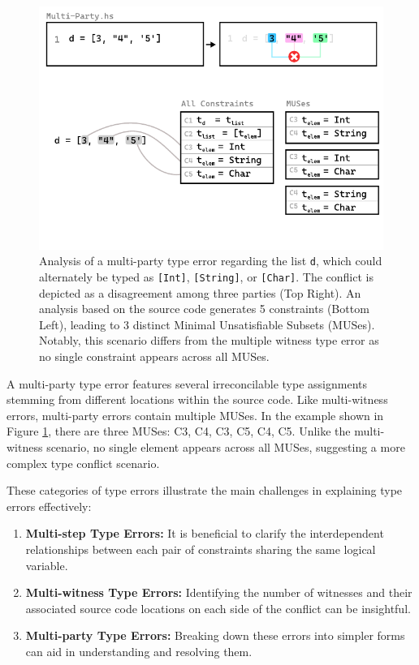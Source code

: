 \begin{figure}[hbt]
  \includegraphics[width=\linewidth]{Multi-Party-MUS}
  \caption{\label{fig:multi-party-2} Analysis of a multi-party type error regarding the list \texttt{d}, which could alternately be typed as \texttt{[Int]}, \texttt{[String]}, or \texttt{[Char]}. The conflict is depicted as a disagreement among three parties (Top Right). An analysis based on the source code generates 5 constraints (Bottom Left), leading to 3 distinct Minimal Unsatisfiable Subsets (MUSes). Notably, this scenario differs from the multiple witness type error as no single constraint appears across all MUSes.}
  \end{figure}

A multi-party type error features several irreconcilable type assignments stemming from different locations within the source code. Like multi-witness errors, multi-party errors contain multiple MUSes. In the example shown in Figure \ref{fig:multi-party-2}, there are three MUSes: {C3, C4}, {C3, C5}, {C4, C5}. Unlike the multi-witness scenario, no single element appears across all MUSes, suggesting a more complex type conflict scenario.

These categories of type errors illustrate the main challenges in explaining type errors effectively:
\begin{enumerate}
  \item {
    \textbf{Multi-step Type Errors:} It is beneficial to clarify the interdependent relationships between each pair of constraints sharing the same logical variable.
  }
  \item {
    \textbf{Multi-witness Type Errors:} Identifying the number of witnesses and their associated source code locations on each side of the conflict can be insightful.
  }
  \item {
    \textbf{Multi-party Type Errors:} Breaking down these errors into simpler forms can aid in understanding and resolving them.
  }
\end{enumerate}


